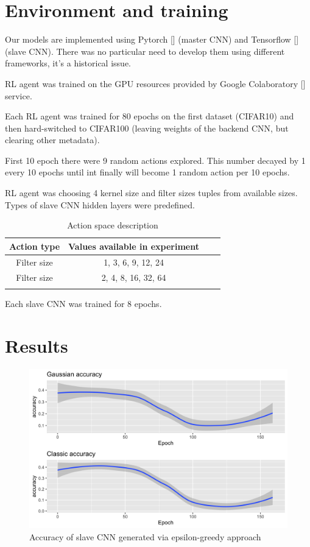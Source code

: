 \section{Environment and training}

Our models are implemented using Pytorch [\cite{NEURIPS2019_9015}] (master CNN) and Tensorflow [\cite{tensorflow2015-whitepaper}](slave CNN). There was no particular need to develop them using different frameworks, it's a historical issue.

RL agent was trained on the GPU resources provided by Google Colaboratory [\cite{colab}] service.

Each RL agent was trained for 80 epochs on the first dataset (CIFAR10) and then hard-switched to CIFAR100 (leaving weights of the backend CNN, but clearing other metadata).

First 10 epoch there were 9 random actions explored. This number decayed by 1 every 10 epochs until int finally will become 1 random action per 10 epochs.

RL agent was choosing 4 kernel size and filter sizes tuples from available sizes. Types of slave CNN hidden layers were predefined.

\begin{table}[h!]
\centering
\begin{tabular}{c c c c} 
 \hline
	Action type & Values available in experiment\\ [0.5ex] 
 \hline
	Filter size & 1, 3, 6, 9, 12, 24 \\
 \hline
	Filter size & 2, 4, 8, 16, 32, 64 \\
 \hline \\ [0.5ex]
\end{tabular}
\caption{Action space description}
\label{table:3}
\end{table} 

Each slave CNN was trained for 8 epochs.

\section{Results}

\begin{figure}[!htb]
  \includegraphics[width=\linewidth]{images/epsilon_greedy.png}
  \caption{Accuracy of slave CNN generated via epsilon-greedy approach}
  \label{fig:egreedy}
\end{figure}

